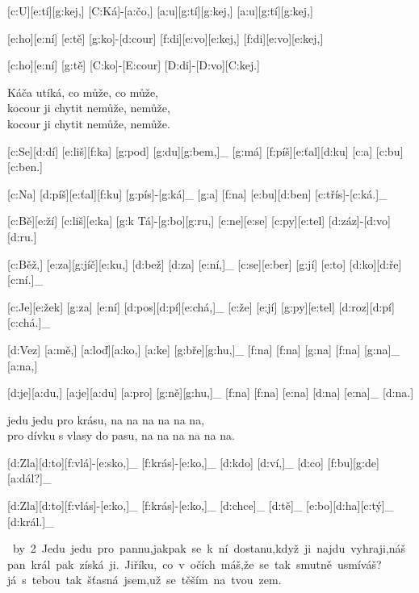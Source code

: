 [c:U][e:tí][g:kej,] [C:Ká]-[a:čo,] %
[a:u][g:tí][g:kej,] [a:u][g:tí][g:kej,]

[e:ho][e:ní] [e:tě] [g:ko]-[d:cour] %
[f:di][e:vo][e:kej,] [f:di][e:vo][e:kej,]

[c:ho][e:ní] [g:tě] [C:ko]-[E:cour] [D:di]-[D:vo][C:kej.]

Káča utíká, co může, co může,\\
kocour ji chytit nemůže, nemůže,\\
kocour ji chytit nemůže, nemůže.



[c:Se][d:dí] [e:liš][f:ka] [g:pod] [g:du][g:bem,]_
[g:má] [f:píš][e:ťal][d:ku] [c:a] [c:bu][c:ben.]

[c:Na] [d:píš][e:ťal][f:ku] [g:pís]-[g:ká]_
[g:a] [f:na] [e:bu][d:ben] [c:třís]-[c:ká.]_



[c:Bě][e:ží] [c:liš][e:ka] [g:k Tá]-[g:bo][g:ru,] %
[c:ne][e:se] [c:py][e:tel] [d:záz]-[d:vo][d:ru.]

[c:Běž,] [e:za][g:jíč][e:ku,] [d:bež] [d:za] [e:ní,]_
[c:se][e:ber] [g:jí] [e:to] [d:ko][d:ře][c:ní.]_

[c:Je][e:žek] [g:za] [e:ní] [d:pos][d:pí][e:chá,]_
[c:že] [e:jí] [g:py][e:tel] [d:roz][d:pí][c:chá.]_



[d:Vez] [a:mě,] [a:loď][a:ko,] [a:ke] [g:bře][g:hu,]_
[f:na] [f:na] [g:na] [f:na] [g:na]_ [a:na,]

[d:je][a:du,] [a:je][a:du] [a:pro] [g:ně][g:hu,]_
[f:na] [f:na] [e:na] [d:na] [e:na]_ [d:na.]

jedu jedu pro krásu, na na na na na na,\\
pro dívku s vlasy do pasu, na na na na na na.

[d:Zla][d:to][f:vlá]-[e:sko,]_ [f:krás]-[e:ko,]_
[d:kdo] [d:ví,]_ [d:co] [f:bu][g:de] [a:dál?]_

[d:Zla][d:to][f:vlás]-[e:ko,]_ [f:krás]-[e:ko,]_
[d:chce]_ [d:tě]_ [e:bo][d:ha][c:tý]_ [d:král.]_

\leavevmode
\hbox{%
\divide\hsize by 2
\vbox{Jedu jedu pro pannu,\\
jakpak se k ní dostanu,\\
když ji najdu vyhraji,\\
náš pan král pak získá ji.}%
\vbox{Jiříku, co v očích máš,\\
že se tak smutně usmíváš?\\
já s tebou tak šťasná jsem,\\
už se těším na tvou zem.}}


